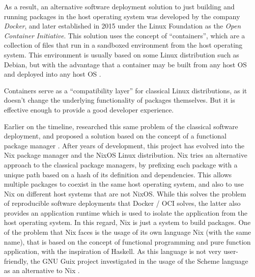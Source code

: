 As a result, an alternative software deployment solution to
just building and running packages in the host operating
system was developed by the company \textit{Docker}, and
later established in 2015 under the Linux Foundation as the
\textit{Open Container Initiative}. This solution uses the
concept of ``containers'', which are a collection of files
that run in a sandboxed environment from the host operating
system. This environment is usually based on some Linux
distribution such as Debian, but with the advantage that a
container may be built from any host \ac{OS} and deployed
into any host \ac{OS} .

Containers serve as a ``compatibility layer'' for classical
Linux distributions, as it doesn't change the underlying
functionality of packages themselves. But it is effective
enough to provide a good developer experience.

Earlier on the timeline, \citeauthor{dolstraNixOS2008}
researched this same problem of the classical software
deployment, and proposed a solution based on the concept of
a functional package manager \cite{dolstraNixOS2008} . After
years of development, this project has evolved into the Nix
package manager and the NixOS Linux distribution. Nix tries
an alternative approach to the classical package managers,
by prefixing each package with a unique path based on a hash
of its definition and dependencies. This allows multiple
packages to coexist in the same host operating system, and
also to use Nix on different host systems that are not
NixOS. While this solves the problem of reproducible
software deployments that Docker / OCI solves, the latter
also provides an application runtime which is used to
isolate the application from the host operating system. In
this regard, Nix is just a system to build packages. One of
the problem that Nix faces is the usage of its own
language Nix (with the same name), that is based on the
concept of functional programming and pure function
application, with the inspiration of Haskell. As this
language is not very user-friendly, the GNU Guix project
investigated in the usage of the Scheme language as an
alternative to Nix
\cite{courtesFunctionalPackageManagement2013} .
